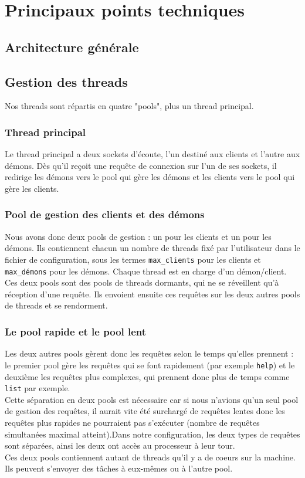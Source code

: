 \section{Principaux points techniques}


\subsection{Architecture générale}




\subsection{Gestion des threads}
Nos threads sont répartis en quatre "pools", plus un thread principal.

\subsubsection{Thread principal}
Le thread principal a deux sockets d'écoute, l'un destiné aux clients et
l'autre aux démons. Dès qu'il reçoit une requête de connexion sur l'un de
ses sockets, il redirige les démons vers le pool qui gère les démons et
les clients vers le pool qui gère les clients.

\subsubsection{Pool de gestion des clients et des démons}
Nous avons donc deux pools de gestion : un pour les clients et un pour
les démons. Ils contiennent chacun un nombre de threads fixé par
l'utilisateur dans le fichier de configuration, sous les termes 
\verb$max_clients$ pour les clients et \verb$max_démons$ pour les démons.
Chaque thread est en charge d'un démon/client. \\
Ces deux pools sont des pools de threads dormants, qui ne se réveillent qu'à 
réception d'une requête. Ils envoient ensuite ces requêtes sur les deux autres
pools de threads et se rendorment.

\subsubsection{Le pool rapide et le pool lent}
Les deux autres pools gèrent donc les requêtes selon le temps qu'elles 
prennent : le premier pool gère les requêtes qui se font rapidement 
(par exemple \verb$help$) et le deuxième les requêtes plus complexes, qui 
prennent donc plus de temps comme \verb$list$ par exemple.\\
Cette séparation en deux pools est nécessaire car si nous n'avions qu'un seul 
pool de gestion des requêtes, il aurait vite été surchargé de requêtes lentes
donc les requêtes plus rapides ne pourraient pas s'exécuter (nombre de requêtes
simultanées maximal atteint).Dans notre configuration, les deux types de 
requêtes sont séparées, ainsi les deux ont accès au processeur à leur tour.\\
Ces deux pools contiennent autant de threads qu'il y a de coeurs sur la
machine. Ils peuvent s'envoyer des tâches à eux-mêmes ou à l'autre pool.

